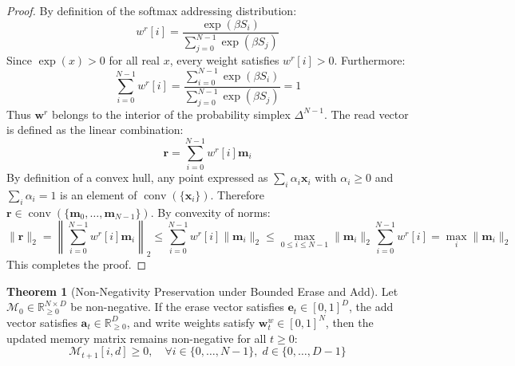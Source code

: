\documentclass[11pt,a4paper]{article}
\theoremstyle{definition}
\newtheorem{theorem}{\textbf{Theorem}}[section]
\begin{document}
\begin{proof}
By definition of the softmax addressing distribution:
{\boldmath
\begin{equation}
w^r[i] = \frac{\exp(\beta S_i)}{\sum_{j=0}^{N-1} \exp(\beta S_j)}
\end{equation}
}
Since $\exp(x) > 0$ for all real $x$, every weight satisfies $w^r[i] > 0$.
Furthermore:
{\boldmath
\begin{equation}
\sum_{i=0}^{N-1} w^r[i] = \frac{\sum_{i=0}^{N-1} \exp(\beta S_i)}{\sum_{j=0}^{N-1} \exp(\beta S_j)} = 1
\end{equation}
}
Thus $\mathbf{w}^r$ belongs to the interior of the probability simplex $\Delta^{N-1}$.
The read vector is defined as the linear combination:
{\boldmath
\begin{equation}
\mathbf{r} = \sum_{i=0}^{N-1} w^r[i] \mathbf{m}_i
\end{equation}
}
By definition of a convex hull, any point expressed as $\sum_i \alpha_i \mathbf{x}_i$ with $\alpha_i \ge 0$ and $\sum_i \alpha_i = 1$ is an element of $\operatorname{conv}(\{\mathbf{x}_i\})$. Therefore $\mathbf{r} \in \operatorname{conv}(\{\mathbf{m}_0, \dots, \mathbf{m}_{N-1}\})$.
By convexity of norms:
{\boldmath
\begin{equation}
\|\mathbf{r}\|_2 = \left\| \sum_{i=0}^{N-1} w^r[i] \mathbf{m}_i \right\|_2 \le \sum_{i=0}^{N-1} w^r[i] \|\mathbf{m}_i\|_2 \le \max_{0 \le i \le N-1} \|\mathbf{m}_i\|_2 \sum_{i=0}^{N-1} w^r[i] = \max_i \|\mathbf{m}_i\|_2
\end{equation}
}
This completes the proof.
\end{proof}

\begin{theorem}[Non-Negativity Preservation under Bounded Erase and Add]
Let $\mathcal{M}_0 \in \mathbb{R}_{\ge 0}^{N \times D}$ be non-negative. If the erase vector satisfies $\mathbf{e}_t \in [0, 1]^D$, the add vector satisfies $\mathbf{a}_t \in \mathbb{R}_{\ge 0}^D$, and write weights satisfy $\mathbf{w}_t^w \in [0, 1]^N$, then the updated memory matrix remains non-negative for all $t \ge 0$:
{\boldmath
\begin{equation}
\mathcal{M}_{t+1}[i, d] \ge 0, \quad \forall i \in \{0, \dots, N-1\}, \; d \in \{0, \dots, D-1\}
\end{equation}
}
\end{theorem}
\end{document}
